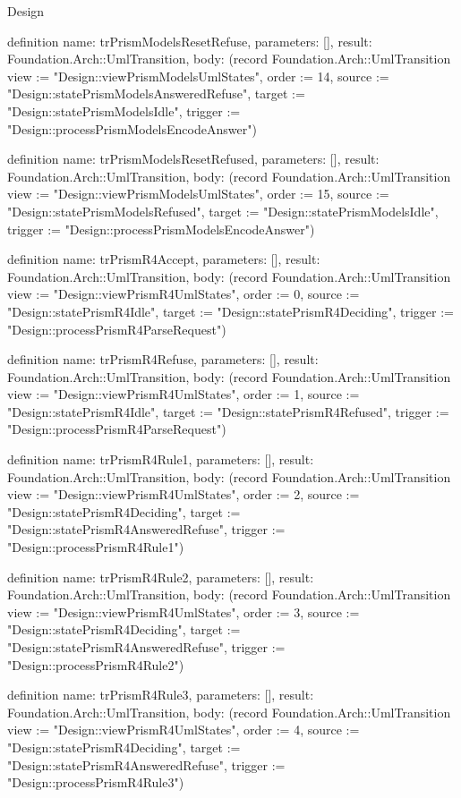 \begin{lexlean}{Design}
\begin{semanticmodule}
definition{
  name: trPrismModelsResetRefuse,
  parameters: [],
  result: Foundation.Arch::UmlTransition,
  body: (record Foundation.Arch::UmlTransition {view := "Design::viewPrismModelsUmlStates", order := 14, source := "Design::statePrismModelsAnsweredRefuse", target := "Design::statePrismModelsIdle", trigger := "Design::processPrismModelsEncodeAnswer"})
}

definition{
  name: trPrismModelsResetRefused,
  parameters: [],
  result: Foundation.Arch::UmlTransition,
  body: (record Foundation.Arch::UmlTransition {view := "Design::viewPrismModelsUmlStates", order := 15, source := "Design::statePrismModelsRefused", target := "Design::statePrismModelsIdle", trigger := "Design::processPrismModelsEncodeAnswer"})
}

definition{
  name: trPrismR4Accept,
  parameters: [],
  result: Foundation.Arch::UmlTransition,
  body: (record Foundation.Arch::UmlTransition {view := "Design::viewPrismR4UmlStates", order := 0, source := "Design::statePrismR4Idle", target := "Design::statePrismR4Deciding", trigger := "Design::processPrismR4ParseRequest"})
}

definition{
  name: trPrismR4Refuse,
  parameters: [],
  result: Foundation.Arch::UmlTransition,
  body: (record Foundation.Arch::UmlTransition {view := "Design::viewPrismR4UmlStates", order := 1, source := "Design::statePrismR4Idle", target := "Design::statePrismR4Refused", trigger := "Design::processPrismR4ParseRequest"})
}

definition{
  name: trPrismR4Rule1,
  parameters: [],
  result: Foundation.Arch::UmlTransition,
  body: (record Foundation.Arch::UmlTransition {view := "Design::viewPrismR4UmlStates", order := 2, source := "Design::statePrismR4Deciding", target := "Design::statePrismR4AnsweredRefuse", trigger := "Design::processPrismR4Rule1"})
}

definition{
  name: trPrismR4Rule2,
  parameters: [],
  result: Foundation.Arch::UmlTransition,
  body: (record Foundation.Arch::UmlTransition {view := "Design::viewPrismR4UmlStates", order := 3, source := "Design::statePrismR4Deciding", target := "Design::statePrismR4AnsweredRefuse", trigger := "Design::processPrismR4Rule2"})
}

definition{
  name: trPrismR4Rule3,
  parameters: [],
  result: Foundation.Arch::UmlTransition,
  body: (record Foundation.Arch::UmlTransition {view := "Design::viewPrismR4UmlStates", order := 4, source := "Design::statePrismR4Deciding", target := "Design::statePrismR4AnsweredRefuse", trigger := "Design::processPrismR4Rule3"})
}


\end{semanticmodule}
\end{lexlean}
